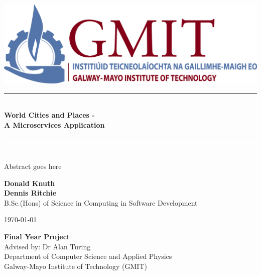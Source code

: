 \documentclass[11pt,a4paper,oneside,openany]{book}
\newcommand{\projecttitle}{ World Cities and Places - \\ A Microservices Application}
\newcommand{\projectauthor}{Donald Knuth \\[0.2cm] Dennis Ritchie}
\newcommand{\projectadvisor}{Dr Alan Turing}
\newcommand{\projectprogramme}{B.Sc.(Hons) of Science in Computing in Software Development}
\newcommand{\projectabstract}{Abstract goes here}
\newcommand{\projectdate}{\today}
\begin{document}
  \begin{titlepage}
  	 \begin{center}    
  		\includegraphics{img/gmit-logo.jpg}
  	\end{center}
    \begin{minipage}[t][4cm]{\textwidth}
      \centering
      \rule{\linewidth}{0.5mm} \\[0.4cm]
      { \LARGE \bfseries \projecttitle \\[0.4cm] }
      \rule{\linewidth}{0.5mm} \\[0.8cm]
    \end{minipage}
    
      \begin{minipage}[t][5.5cm]{\textwidth}
    	\centering
    	
    	\projectabstract
    \end{minipage}
    
    \begin{minipage}[t][3.5cm]{\textwidth}
      \centering
      \textbf{\projectauthor}\\[0.5cm]
      \projectprogramme
    \end{minipage}
   

  
    \begin{minipage}[t][1cm]{\textwidth}
      \centering
      \textsc{\projectdate}
    \end{minipage}
      
    \begin{minipage}[t][3cm]{\textwidth}
      \centering
      \textbf{Final Year Project}\\[0.3cm]
      Advised by: \projectadvisor \\[0.1cm]
      Department of Computer Science and Applied Physics\\
      Galway-Mayo Institute of Technology (GMIT)
    \end{minipage}
  
   
  \end{titlepage}
   
  \setcounter{page}{2}
  \tableofcontents
  \listoffigures
  
    
 	
  
  
  
  
  
  
  
  
\end{document}
